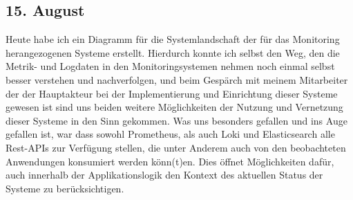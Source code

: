 \subsection{15. August}
Heute habe ich ein Diagramm für die Systemlandschaft der für das Monitoring herangezogenen Systeme erstellt. Hierdurch konnte ich selbst den Weg, den die Metrik- und Logdaten in den Monitoringsystemen nehmen noch einmal selbst besser verstehen und nachverfolgen, und beim Gespärch mit meinem Mitarbeiter der der Hauptakteur bei der Implementierung und Einrichtung dieser Systeme gewesen ist sind uns beiden weitere Möglichkeiten der Nutzung und Vernetzung dieser Systeme in den Sinn gekommen. Was uns besonders gefallen und ins Auge gefallen ist, war dass sowohl Prometheus, als auch Loki und Elasticsearch alle Rest-APIs zur Verfügung stellen, die unter Anderem auch von den beobachteten Anwendungen konsumiert werden könn(t)en. Dies öffnet Möglichkeiten dafür, auch innerhalb der Applikationslogik den Kontext des aktuellen Status der Systeme zu berücksichtigen.